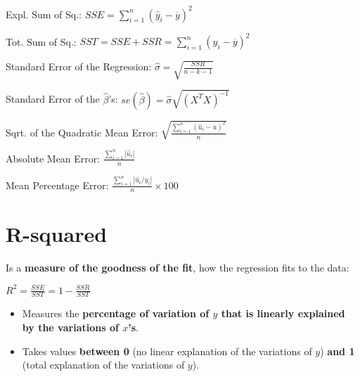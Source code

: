 \documentclass[10pt, a4paper, landscape]{extarticle}
\begin{document}
\begin{multicols}{3}
\vspace*{0.5mm}

Expl. Sum of Sq.: \hfill $SSE = \sum_{i=1}^n (\hat{y}_i - \overline{y})^2$

\vspace*{0.5mm}

Tot. Sum of Sq.: \hfill $SST = SSE + SSR = \sum_{i=1}^n (y_i - \overline{y})^2$

\vspace*{0.5mm}

Standard Error of the Regression: \hfill $\hat{\sigma} = \sqrt{\frac{SSR}{n-k-1}}$

\vspace*{0.5mm}

Standard Error of the $\hat{\beta}$'s: \hfill $se(\hat{\beta}) = \hat{\sigma} \sqrt{(X^T X)^{-1}}$

\vspace*{0.5mm}

Sqrt. of the Quadratic Mean Error: \hfill $\sqrt{\frac{\sum_{i=1}^n (\hat{u}_i - \overline{u})^2}{n}}$

\vspace*{0.5mm}

Absolute Mean Error: \hfill $\frac{\sum_{i=1}^n |\hat{u}_i|}{n}$

\vspace*{0.5mm}

Mean Percentage Error: \hfill $\frac{\sum_{i=1}^n |\hat{u}_i / y_i|}{n} \times 100$

\columnbreak

\section*{R-squared}

Is a \textbf{measure of the goodness of the fit}, how the regression fits to the data:

\begin{center}
$R^2 = \frac{SSE}{SST} = 1 - \frac{SSR}{SST}$
\end{center}

\begin{itemize}[leftmargin=*]
\item Measures the \textbf{percentage of variation of $y$ that is linearly explained by the variations of $x$'s}.
\item Takes values \textbf{between 0} (no linear explanation of the variations of $y$) \textbf{and 1} (total explanation of the variations of $y$).
\end{itemize}


\end{multicols}
\end{document}
